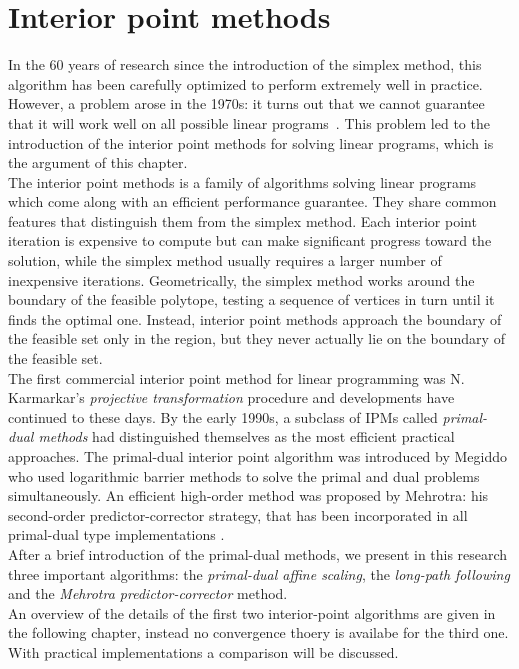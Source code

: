 \documentclass[a4paper,10 pt,titlepage,twoside]{book}
\theoremstyle{plain}
\theoremstyle{definition}
\theoremstyle{remark}
\begin{document}
\chapter{Interior point methods}
In the 60 years of research since the introduction of the simplex method, this algorithm has been carefully optimized to perform extremely well in practice. However, a problem arose in the 1970s: it turns out that we cannot guarantee that it will work well on all possible linear programs~\cite{3}.
This problem led to the introduction of the interior point methods for solving linear programs, which is the argument of this chapter.\\The interior point methods is a family of algorithms solving linear programs which come along with an efficient performance guarantee. They share common features that distinguish them from the simplex method. Each interior point iteration is expensive to compute but can make significant progress toward the solution, while the simplex method usually requires a larger number of inexpensive iterations. Geometrically, the simplex method works around the boundary of the feasible polytope, testing a sequence of vertices in turn until it finds the optimal one. Instead, interior point methods approach the boundary of the feasible set only in the region, but they never actually lie on the boundary of the feasible set.\\
The first commercial interior point method for linear programming was N. Karmarkar's  \textit{projective transformation} procedure \cite{Kar} and developments have continued to these days. 
By the early 1990s, a subclass of IPMs called \textit{primal-dual methods} had distinguished themselves as the most efficient practical approaches. The primal-dual interior point algorithm was introduced by Megiddo \cite{meg}  who used logarithmic barrier methods to solve
the primal and dual problems simultaneously. An efficient
high-order method was proposed by Mehrotra: his second-order predictor-corrector
strategy, that has been incorporated in all primal-dual type implementations \cite{MER} .\\ 
After a brief introduction of the primal-dual methods, we present in this research three important algorithms: the \textit{primal-dual affine scaling}, the \textit{long-path following} and the \textit{Mehrotra predictor-corrector} method.\\
An overview of the details of the first two interior-point algorithms are given in the following chapter, instead no convergence thoery is availabe for the third one. With practical implementations a comparison will be discussed.
\end{document}
